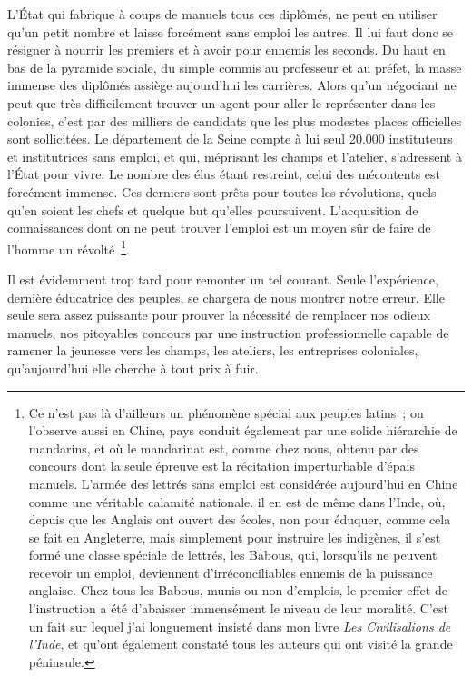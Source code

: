 \documentclass[french,twoside]{book} %
\begin{document}
L’État qui fabrique à coups de manuels tous ces diplômés, ne peut en utiliser qu’un petit nombre et laisse forcément sans emploi les autres. Il lui faut donc se résigner à nourrir les premiers et à avoir pour ennemis les seconds. Du haut en bas de la pyra­mide sociale, du simple commis au professeur et au préfet, la masse immense des diplômés assiège aujourd’hui les carrières. Alors qu’un négociant ne peut que très difficilement trouver un agent pour aller le représenter dans les colonies, c’est par des milliers de candidats que les plus modestes places officielles sont sollicitées. Le département de la Seine compte à lui seul 20.000 instituteurs et institutrices sans emploi, et qui, méprisant les champs et l’atelier, s’adressent à l’État pour vivre. Le nombre des élus étant restreint, celui des mécontents est forcément immense. Ces derniers sont prêts pour toutes les révolutions, quels qu’en soient les chefs et quelque but qu’elles poursuivent. L’acquisition de connaissances dont on ne peut trouver l’emploi est un moyen sûr de faire de l’homme un révolté \footnote{Ce n’est pas là d’ailleurs un phénomène spécial aux peuples latins ; on l’observe aussi en Chine, pays conduit également par une solide hiérarchie de mandarins, et où le mandarinat est, comme chez nous, obtenu par des concours dont la seule épreuve est la récitation imperturbable d’épais manuels. L’armée des lettrés sans emploi est considérée aujourd’hui en Chine comme une vérita­ble calamité nationale. il en est de même dans l’Inde, où, depuis que les Anglais ont ouvert des écoles, non pour éduquer, comme cela se fait en Angleterre, mais simplement pour instruire les indi­gènes, il s’est formé une classe spéciale de lettrés, les Babous, qui, lorsqu’ils ne peuvent recevoir un emploi, deviennent d’irréconciliables ennemis de la puissance anglaise. Chez tous les Babous, munis ou non d’emplois, le premier effet de l’instruction a été d’abaisser immensément le niveau de leur moralité. C’est un fait sur lequel j’ai longuement insisté dans mon livre \emph{Les Civilisalions de l’Inde}, et qu’ont également constaté tous les auteurs qui ont visité la grande péninsule.}.\par
Il est évidemment trop tard pour remonter un tel courant. Seule l’expérience, dernière éducatrice des peuples, se chargera de nous montrer notre erreur. Elle seule sera assez puissante pour prouver la nécessité de remplacer nos odieux manuels, nos pitoyables concours par une instruction professionnelle capable de ramener la jeu­nesse vers les champs, les ateliers, les entreprises coloniales, qu’aujourd’hui elle cherche à tout prix à fuir.\par
\end{document}
